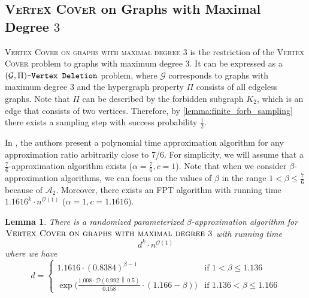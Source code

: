 \documentclass[letterpaper,11pt]{article}
\newcommand{\1}[1]{\mathds{1}\left[#1\right]}
\newcommand{\D}[2]{\mathcal{D}\left(#1\, \middle\|\,#2 \right)}
\newcommand{\Oh}{\mathcal{O}}
\newtheorem{lemma}[theorem]{Lemma}
\newcommand{\gpivd}[1][\mathcal{G},\Pi]{(#1)\textnormal{\texttt{-Vertex Deletion}}}
\newcommand{\vcmaxdegthree}{\textsc{Vertex Cover on graphs with maximal degree $3$}\xspace}
\newcommand{\vc}{\textsc{Vertex Cover}\xspace}
\begin{document}
 
\subsection{\vc on Graphs with Maximal Degree $3$}
\vcmaxdegthree is the restriction of the \vc problem to graphs with maximum degree 3. 
It can be expressed as a $\gpivd$ problem, where $\mathcal{G}$ corresponds to graphs with maximum degree 3 and the hypergraph property $\Pi$ consists of all edgeless graphs.
Note that $\Pi$ can be described by the forbidden subgraph $K_2$, which is an
edge that consists of two vertices. Therefore, by \cref{lemma:finite_forb_sampling}
there exists a sampling step with success probability $\frac{1}{2}$.

In \cite{bermanApproximationPropertiesIndependent1999}, the authors present a polynomial time approximation algorithm for any approximation ratio arbitrarily close to 7/6.
For simplicity, we will assume that a $\frac{7}{6}$-approximation algorithm exists ($\alpha = \frac{7}{6}, c = 1$).
Note that when we consider $\beta$-approximation algorithms, we can focus on the values of
$\beta$ in the range $1 < \beta \leq \frac{7}{6}$ because of $\mathcal{A}_2$.
Moreover, there exists an FPT algorithm with running time $1.1616^{k} \cdot n^{\Oh(1)}$
\cite{xiaoNoteVertexCover2010} ($\alpha = 1, c = 1.1616$).

\begin{lemma}\label{lemma:vcmaxdegthree_running_time}
	There is a randomized parameterized $\beta$-approximation algorithm
	for\\ $\vcmaxdegthree$ with running time
	\begin{equation*}
		d^{k} \cdot n^{\Oh(1)}
	\end{equation*}
	where we have
	\begin{equation}\label{eq:4pthvc_runtime}
		d = \begin{cases}
				1.1616 \cdot \left(0.8384\right) ^{\beta - 1}  &\text{if } 1 < \beta \leq 1.136 \\ 			
			 \exp\biggl( \frac{ 1.008 \cdot \D{ 0.992 }{ 0.5 }  }{ 0.158 } \cdot (1.166 - \beta)  \biggr) &\text{if } 1.136 < \beta \leq 1.166			
				
		\end{cases}
	\end{equation}	
\end{lemma}
\end{document}
